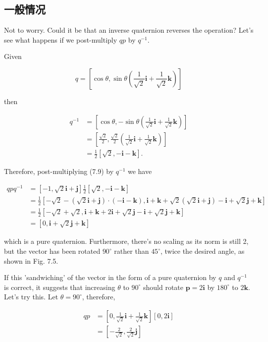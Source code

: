 \subsection{一般情况}
Not to worry. Could it be that an inverse quaternion reverses the operation? Let's see what happens if we post-multiply $q p$ by $q^{-1}$.

Given

$$
q=\left[\cos \theta, \sin \theta\left(\frac{1}{\sqrt{2}} \mathbf{i}+\frac{1}{\sqrt{2}} \mathbf{k}\right)\right]
$$

then

$$
\begin{aligned}
q^{-1} & =\left[\cos \theta,-\sin \theta\left(\frac{1}{\sqrt{2}} \mathbf{i}+\frac{1}{\sqrt{2}} \mathbf{k}\right)\right] \\
& =\left[\frac{\sqrt{2}}{2}, \frac{\sqrt{2}}{2}\left(\frac{1}{\sqrt{2}} \mathbf{i}+\frac{1}{\sqrt{2}} \mathbf{k}\right)\right] \\
& =\frac{1}{2}[\sqrt{2},-\mathbf{i}-\mathbf{k}] .
\end{aligned}
$$

Therefore, post-multiplying (7.9) by $q^{-1}$ we have

$$
\begin{aligned}
q p q^{-1} & =[-1, \sqrt{2} \mathbf{i}+\mathbf{j}] \frac{1}{2}[\sqrt{2},-\mathbf{i}-\mathbf{k}] \\
& =\frac{1}{2}[-\sqrt{2}-(\sqrt{2} \mathbf{i}+\mathbf{j}) \cdot(-\mathbf{i}-\mathbf{k}), \mathbf{i}+\mathbf{k}+\sqrt{2}(\sqrt{2} \mathbf{i}+\mathbf{j})-\mathbf{i}+\sqrt{2} \mathbf{j}+\mathbf{k}] \\
& =\frac{1}{2}[-\sqrt{2}+\sqrt{2}, \mathbf{i}+\mathbf{k}+2 \mathbf{i}+\sqrt{2} \mathbf{j}-\mathbf{i}+\sqrt{2} \mathbf{j}+\mathbf{k}] \\
& =[0, \mathbf{i}+\sqrt{2} \mathbf{j}+\mathbf{k}]
\end{aligned}
$$

which is a pure quaternion. Furthermore, there's no scaling as its norm is still 2, but the vector has been rotated $90^{\circ}$ rather than $45^{\circ}$, twice the desired angle, as shown in Fig. 7.5.

If this 'sandwiching' of the vector in the form of a pure quaternion by $q$ and $q^{-1}$ is correct, it suggests that increasing $\theta$ to $90^{\circ}$ should rotate $\mathbf{p}=2 \mathbf{i}$ by $180^{\circ}$ to $2 \mathbf{k}$. Let's try this. Let $\theta=90^{\circ}$, therefore,

$$
\begin{aligned}
q p & =\left[0, \frac{1}{\sqrt{2}} \mathbf{i}+\frac{1}{\sqrt{2}} \mathbf{k}\right][0,2 \mathbf{i}] \\
& =\left[-\frac{2}{\sqrt{2}}, \frac{2}{\sqrt{2}} \mathbf{j}\right]
\end{aligned}
$$

